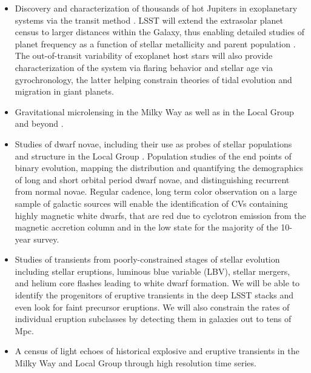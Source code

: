\begin{itemize}


\item Discovery and characterization of thousands of hot Jupiters
  in exoplanetary systems via the transit method \citep{2012ApJ...753..160W}.
LSST will extend the extrasolar planet census to larger distances within the Galaxy, thus enabling detailed studies
of planet frequency as a function of stellar metallicity and parent population \cite[e.g.,][]{2009ApJ...695..336H,2011ApJ...743..103B}.
The out-of-transit variability of exoplanet host stars will also provide characterization of the system
via flaring behavior and stellar age via gyrochronology, the latter helping constrain theories of tidal evolution and
migration in giant planets.

\item Gravitational microlensing in the Milky Way \cite[see][]{2008ApJ...681..806H} as well as in the Local Group and beyond \citep{2008A&A...478..755D}.

\item Studies of dwarf novae, including their use as probes of stellar populations and
      structure in the Local Group
      \citep{2005AJ....129.1873N,2006AJ....131.2980S,2009ApJ...692..324S}. Population
      studies of the end points of binary evolution, mapping the
      distribution and quantifying the demographics of
      long and short orbital period dwarf novae, and distinguishing
      recurrent from normal novae. Regular cadence, long term color
      observation on a large sample of galactic sources will enable
      the identification of CVs containing highly magnetic white
      dwarfs, that are red due to cyclotron emission from the magnetic
      accretion column and in the low state for the majority of the 10-year survey.

\item Studies of  transients from poorly-constrained stages of stellar evolution including
stellar eruptions,  luminous blue variable (LBV), stellar mergers, and
helium core flashes leading to white dwarf formation.  We will be able
to identify the progenitors of eruptive transients in the
deep LSST stacks and even look for faint precursor eruptions.  We will
also constrain the rates of individual eruption subclasses
\citep{2014ARA&A..52..487S} by detecting them in galaxies out to tens
of Mpc.

\item A census of light echoes of historical explosive and eruptive
  transients in the Milky Way and Local Group through high resolution
  time series.


\end{itemize}
